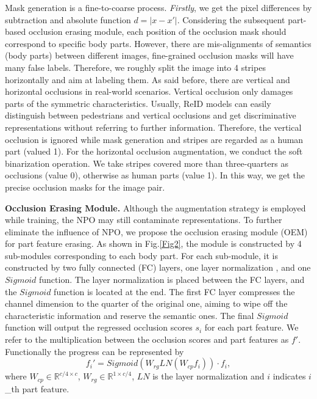 \documentclass[10pt,twocolumn,letterpaper]{article}
\begin{document}
Mask generation is a fine-to-coarse process. \emph{Firstly}, we get the pixel differences by subtraction and absolute function $d = |x-x'|$. 
Considering the subsequent part-based occlusion erasing module, each position of the occlusion mask should correspond to specific body parts. 
However, there are mis-alignments of semantics (body parts) between different images, fine-grained occlusion masks will have many false labels. Therefore, we roughly split the image into 4 stripes horizontally and aim at labeling them.
As said before, there are vertical and horizontal occlusions in real-world scenarios. 
Vertical occlusion only damages parts of the symmetric characteristics. Usually, ReID models can easily distinguish between pedestrians and vertical occlusions and get discriminative representations without referring to further information. Therefore, the vertical occlusion is ignored while mask generation and stripes are regarded as a human part (valued 1).
For the horizontal occlusion augmentation, we conduct the soft binarization operation. We take stripes covered more than three-quarters as occlusions (value 0), otherwise as human parts (value 1). In this way, we get the precise occlusion masks for the image pair.


\textbf{Occlusion Erasing Module.}
Although the augmentation strategy is employed while training, the NPO may still contaminate representations. To further eliminate the influence of NPO, we propose the occlusion erasing module (OEM) for part feature erasing. 
As shown in Fig.\ref{Fig2}, the module is constructed by 4 sub-modules corresponding to each body part. For each sub-module, it is constructed by two fully connected (FC) layers, one layer normalization \cite{ba2016layer}, and one $Sigmoid$ function. The layer normalization is placed between the FC layers, and the $Sigmoid$ function is located at the end. The first FC layer compresses the channel dimension to the quarter of the original one, aiming to wipe off the characteristic information and reserve the semantic ones. The final $Sigmoid$ function will output the regressed occlusion scores $s_i$ for each part feature. We refer to the multiplication between the occlusion scores and part features as $f'$. Functionally the progress can be represented by
\begin{equation}
    f_i'=Sigmoid(W_{rg}LN(W_{cp}f_i)) \cdot f_i,
\end{equation}
where $W_{cp} \in \mathbb{R}^{c/4 \times c}$, $W_{rg} \in \mathbb{R}^{1 \times c/4}$, $LN$ is the layer normalization and $i$ indicates $i$\_th part feature. 
\end{document}
